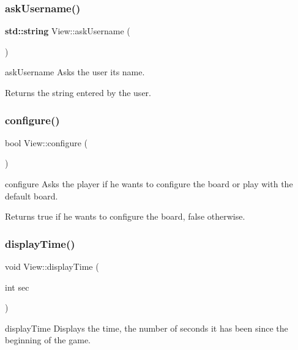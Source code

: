 \subsubsection{\texorpdfstring{ask\+Username()}{askUsername()}}
{\footnotesize\ttfamily \textbf{ std\+::string} View\+::ask\+Username (\begin{DoxyParamCaption}{ }\end{DoxyParamCaption})}



ask\+Username Asks the user its name. 

\begin{DoxyReturn}{Returns}
the string entered by the user. 
\end{DoxyReturn}
\mbox{\label{class_view_a8c735d0d8eba27cee9e4ea10d2161905}} 
\subsubsection{\texorpdfstring{configure()}{configure()}}
{\footnotesize\ttfamily bool View\+::configure (\begin{DoxyParamCaption}{ }\end{DoxyParamCaption})}



configure Asks the player if he wants to configure the board or play with the default board. 

\begin{DoxyReturn}{Returns}
true if he wants to configure the board, false otherwise. 
\end{DoxyReturn}
\mbox{\label{class_view_a52ce6dec383d190722866c0c95175cbc}} 
\subsubsection{\texorpdfstring{display\+Time()}{displayTime()}}
{\footnotesize\ttfamily void View\+::display\+Time (\begin{DoxyParamCaption}\item[{int}]{sec }\end{DoxyParamCaption})\hspace{0.3cm}{\ttfamily [inline]}}



display\+Time Displays the time, the number of seconds it has been since the beginning of the game. 


